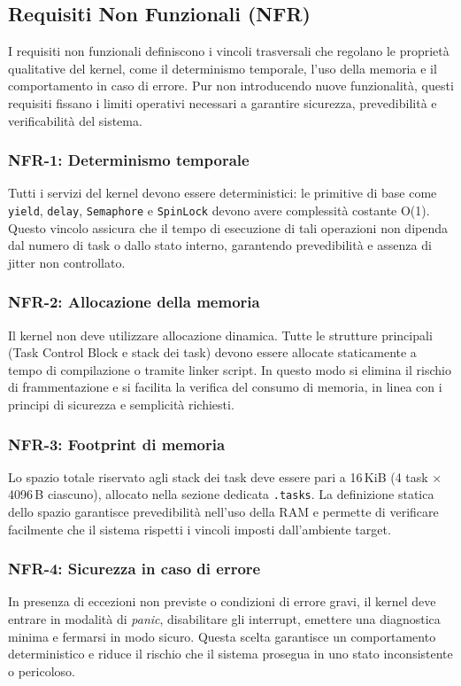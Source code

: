 \documentclass[italian, Lau, oneside]{sapthesis} %
\begin{document}
\subsection{Requisiti Non Funzionali (NFR)}
I requisiti non funzionali definiscono i vincoli trasversali che regolano le proprietà qualitative del kernel, come il determinismo temporale, l’uso della memoria e il comportamento in caso di errore.  
Pur non introducendo nuove funzionalità, questi requisiti fissano i limiti operativi necessari a garantire sicurezza, prevedibilità e verificabilità del sistema.

\subsubsection*{NFR-1: Determinismo temporale}
Tutti i servizi del kernel devono essere deterministici: le primitive di base come \texttt{yield}, \texttt{delay}, \texttt{Semaphore} e \texttt{SpinLock} devono avere complessità costante O(1).  
Questo vincolo assicura che il tempo di esecuzione di tali operazioni non dipenda dal numero di task o dallo stato interno, garantendo prevedibilità e assenza di jitter non controllato.

\subsubsection*{NFR-2: Allocazione della memoria}
Il kernel non deve utilizzare allocazione dinamica. Tutte le strutture principali (Task Control Block e stack dei task) devono essere allocate staticamente a tempo di compilazione o tramite linker script.  
In questo modo si elimina il rischio di frammentazione e si facilita la verifica del consumo di memoria, in linea con i principi di sicurezza e semplicità richiesti.

\subsubsection*{NFR-3: Footprint di memoria}
Lo spazio totale riservato agli stack dei task deve essere pari a 16\,KiB (4 task $\times$ 4096\,B ciascuno), allocato nella sezione dedicata \texttt{.tasks}.  
La definizione statica dello spazio garantisce prevedibilità nell’uso della RAM e permette di verificare facilmente che il sistema rispetti i vincoli imposti dall’ambiente target.

\subsubsection*{NFR-4: Sicurezza in caso di errore}
In presenza di eccezioni non previste o condizioni di errore gravi, il kernel deve entrare in modalità di \emph{panic}, disabilitare gli interrupt, emettere una diagnostica minima e fermarsi in modo sicuro.  
Questa scelta garantisce un comportamento deterministico e riduce il rischio che il sistema prosegua in uno stato inconsistente o pericoloso.
\end{document}
